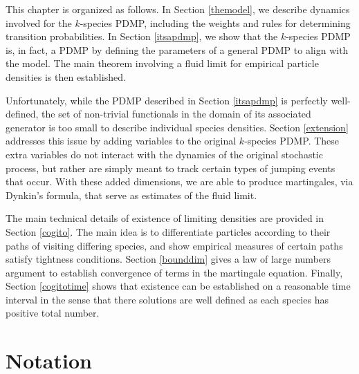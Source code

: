 







This chapter is organized as follows.  In Section \ref{themodel}, we describe dynamics  involved for the $k$-species PDMP, including the weights and rules for determining transition probabilities.  In Section \ref{itsapdmp}, we show that the $k$-species PDMP is, in fact, a PDMP by defining the parameters of a general PDMP to align with the model. The main theorem involving a fluid limit for empirical particle densities is then established.
   
Unfortunately, while the PDMP described in Section \ref{itsapdmp} is perfectly well-defined, the set of non-trivial functionals in the domain of its associated generator is too small to describe individual species densities. Section \ref{extension} addresses this issue by adding variables to the original $k$-species PDMP. These extra variables do not interact with the dynamics of the original stochastic process, but rather are simply meant to track certain types of jumping events that occur. With these added dimensions, we are able to produce   martingales, via Dynkin's formula, that serve as estimates of the fluid limit.

The main technical details of existence of limiting densities are provided in Section \ref{cogito}.  The main idea is to differentiate particles according to their paths of visiting differing species, and show empirical measures of certain paths  satisfy tightness conditions. Section \ref{bounddim} gives a law of large numbers argument to establish convergence of terms in the martingale equation.  Finally, Section \ref{cogitotime} shows that existence can be established on a reasonable time interval in the sense that there solutions are well defined as each species has positive total number.          


\section{Notation}

